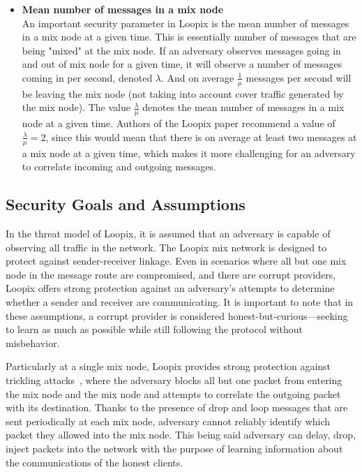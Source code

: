 \documentclass[a4paper,11pt,oneside]{report}
\begin{document}
\begin{itemize}
\item \textbf{Mean number of messages in a mix node} \\
\label{item:lambda_over_mu}
An important security parameter in Loopix is the mean number of messages in a mix node at a given time. This is essentially number of messages that are being "mixed" at the mix node. If an adversary observes messages going in and out of mix node for a given time, it will observe a number of messages coming in per second, denoted \(\lambda\). And on average \(\frac{1}{\mu}\) messages per second will be leaving the mix node (not taking into account cover traffic generated by the mix node). The value \(\frac{\lambda}{\mu}\) denotes the mean number of messages in a mix node at a given time. Authors of the Loopix paper recommend a value of \(\frac{\lambda}{\mu} = 2\), since this would mean that there is on average at least two messages at a mix node at a given time, which makes it more challenging for an adversary to correlate incoming and outgoing messages.
\end{itemize}

\subsection{Security Goals and Assumptions}
\label{sec:loopix_assumptions}
In the threat model of Loopix, it is assumed that an adversary is capable of observing all traffic in the network. The Loopix mix network is designed to protect against sender-receiver linkage. Even in scenarios where all but one mix node in the message route are compromised, and there are corrupt providers, Loopix offers strong protection against an adversary's attempts to determine whether a sender and receiver are communicating. It is important to note that in these assumptions, a corrupt provider is considered honest-but-curious—seeking to learn as much as possible while still following the protocol without misbehavior.

Particularly at a single mix node, Loopix provides strong protection against trickling attacks~\cite{flood}, where the adversary blocks all but one packet from entering the mix node and the mix node and attempts to correlate the outgoing packet with its destination. Thanks to the presence of drop and loop messages that are sent periodically at each mix node, adversary cannot reliably identify which packet they allowed into the mix node. This being said adversary can delay, drop, inject packets into the network with the purpose of learning information about the communications of the honest clients.
\end{document}
